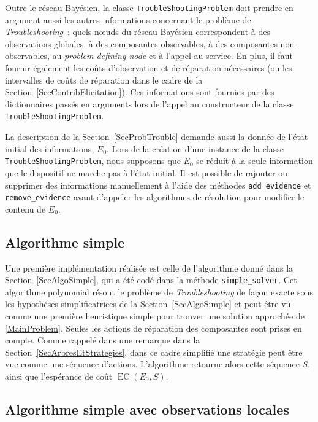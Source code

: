 \documentclass[a4paper,11pt]{article}
\theoremstyle{plain}
\theoremstyle{definition}
\DeclareMathOperator{\EC}{EC}
\begin{document}
Outre le réseau Bayésien, la classe \texttt{TroubleShootingProblem} doit prendre en argument aussi les autres informations concernant le problème de \emph{Troubleshooting}~: quels nœuds du réseau Bayésien correspondent à des observations globales, à des composantes observables, à des composantes non-observables, au \emph{problem defining node} et à l'appel au service. En plus, il faut fournir également les coûts d'observation et de réparation nécessaires (ou les intervalles de coûts de réparation dans le cadre de la Section~\ref{SecContribElicitation}). Ces informations sont fournies par des dictionnaires passés en arguments lors de l'appel au constructeur de la classe \texttt{TroubleShootingProblem}.

La description de la Section~\ref{SecProbTrouble} demande aussi la donnée de l'état initial des informations, $E_0$. Lors de la création d'une instance de la classe \texttt{TroubleShootingProblem}, nous supposons que $E_0$ se réduit à la seule information que le dispositif ne marche pas à l'état initial. Il est possible de rajouter ou supprimer des informations manuellement à l'aide des méthodes \texttt{add\_evidence} et \texttt{remove\_evidence} avant d'appeler les algorithmes de résolution pour modifier le contenu de $E_0$.

\subsection{Algorithme simple}
\label{SecImplAlgoSimple}

Une première implémentation réalisée est celle de l'algorithme donné dans la Section~\ref{SecAlgoSimple}, qui a été codé dans la méthode \texttt{simple\_solver}. Cet algorithme polynomial résout le problème de \emph{Troubleshooting} de façon exacte sous les hypothèses simplificatrices de la Section~\ref{SecAlgoSimple} et peut être vu comme une première heuristique simple pour trouver une solution approchée de \eqref{MainProblem}. Seules les actions de réparation des composantes sont prises en compte. Comme rappelé dans une remarque dans la Section~\ref{SecArbresEtStrategies}, dans ce cadre simplifié une stratégie peut être vue comme une séquence d'actions. L'algorithme retourne alors cette séquence $S$, ainsi que l'espérance de coût $\EC(E_0, S)$.

\subsection{Algorithme simple avec observations locales}
\label{SecImplAlgoSimpleObs}
\end{document}
